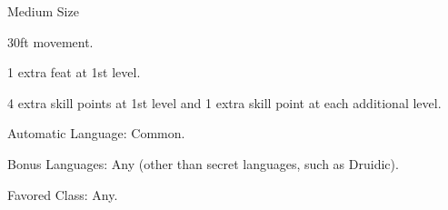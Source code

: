 

\begin{itemize*}
\item Medium Size
\item 30ft movement.
\item 1 extra feat at 1st level.
\item 4 extra skill points at 1st level and 1 extra skill point at each additional level.
\item Automatic Language: Common.
\item Bonus Languages: Any (other than secret languages, such as Druidic).
\item Favored Class: Any.
\end{itemize*}
